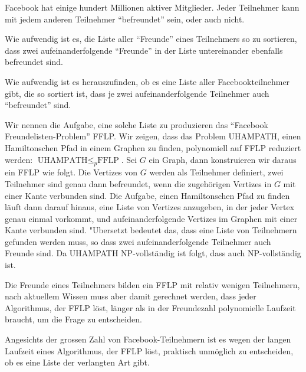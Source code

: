 Facebook hat einige hundert Millionen aktiver Mitglieder.
Jeder Teilnehmer kann mit jedem anderen Teilnehmer ``befreundet''
sein, oder auch nicht.
\begin{teilaufgaben}
\item
Wie aufwendig ist es, die Liste aller ``Freunde''
eines Teilnehmers so zu sortieren, dass zwei aufeinanderfolgende ``Freunde''
in der Liste untereinander ebenfalls befreundet sind.
\item
Wie aufwendig
ist es herauszufinden, ob es eine Liste aller Facebookteilnehmer gibt,
die so sortiert ist, dass je zwei aufeinanderfolgende Teilnehmer
auch ``befreundet'' sind.
\end{teilaufgaben}


\begin{loesung}
Wir nennen die Aufgabe, eine solche Liste zu produzieren das ``Facebook
Freundelisten-Problem'' FFLP. Wir zeigen, dass das Problem
UHAMPATH, einen Hamiltonschen Pfad in einem Graphen zu finden,
polynomiell auf FFLP reduziert werden:
$\text{UHAMPATH}\le_p\text{FFLP}$.
Sei $G$ ein Graph, dann konstruieren wir daraus ein FFLP wie
folgt. Die Vertizes von $G$ werden als Teilnehmer definiert,
zwei Teilnehmer sind genau dann befreundet, wenn die zugehörigen
Vertizes in $G$ mit einer Kante verbunden sind. Die Aufgabe, einen
Hamiltonschen Pfad zu finden läuft dann darauf hinaus, eine Liste
von Vertizes anzugeben, in der jeder Vertex genau einmal vorkommt,
und aufeinanderfolgende Vertizes im Graphen mit einer Kante verbunden
sind. "Ubersetzt bedeutet das, dass eine Liste von Teilnehmern gefunden
werden muss, so dass zwei aufeinanderfolgende Teilnehmer auch Freunde sind.
Da UHAMPATH NP-vollständig ist folgt, dass auch  NP-vollständig
ist.
\begin{teilaufgaben}
\item Die Freunde eines Teilnehmers bilden ein FFLP mit relativ wenigen
Teilnehmern, nach aktuellem Wissen muss aber damit gerechnet werden,
dass jeder Algorithmus, der FFLP löst, länger als in der Freundezahl
polynomielle Laufzeit braucht, um die Frage zu entscheiden.
\item Angesichts der grossen Zahl von Facebook-Teilnehmern ist es
wegen der langen Laufzeit eines Algorithmus, der FFLP löst,
praktisch unmöglich zu entscheiden, ob es eine Liste der verlangten
Art gibt.
\qedhere
\end{teilaufgaben}
\end{loesung}
